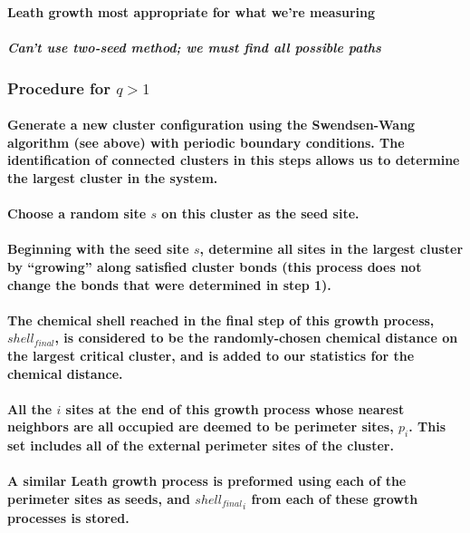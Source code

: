 \documentclass[pre,preprint]{revtex4-1}
\begin{document}
\paragraph{Leath growth most appropriate for what we're measuring}
\label{sec-1.2.2.3}
\subparagraph{Can't use two-seed method; we must find all possible paths}
\label{sec-1.2.2.3.1}
\subsubsection{Procedure for $q>1$}
\label{sec-1.2.3}
\paragraph{Generate a new cluster configuration using the Swendsen-Wang algorithm (see above) with periodic boundary conditions. The identification of connected clusters in this steps allows us to determine the largest cluster in the system.}
\label{sec-1.2.3.1}
\paragraph{Choose a random site $s$ on this cluster as the seed site.}
\label{sec-1.2.3.2}
\paragraph{Beginning with the seed site $s$, determine all sites in the largest cluster by ``growing'' along satisfied cluster bonds (this process does not change the bonds that were determined in step 1).}
\label{sec-1.2.3.3}
\paragraph{The chemical shell reached in the final step of this growth process, $shell_{final}$, is considered to be the randomly-chosen chemical distance on the largest critical cluster, and is added to our statistics for the chemical distance.}
\label{sec-1.2.3.4}
\paragraph{All the $i$ sites at the end of this growth process whose nearest neighbors are all occupied are deemed to be perimeter sites, $p_i$.  This set includes all of the external perimeter sites of the cluster.}
\label{sec-1.2.3.5}
\paragraph{A similar Leath growth process is preformed using each of the perimeter sites as seeds, and ${shell_{final}}_i$ from each of these growth processes is stored.}
\label{sec-1.2.3.6}
\end{document}
